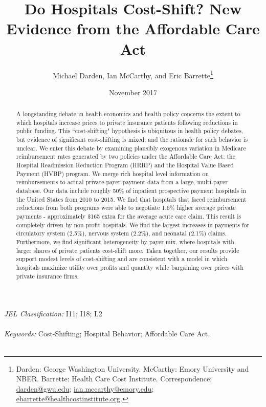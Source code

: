 \documentclass[12pt]{article}
\begin{document}
\title{Do Hospitals Cost-Shift? New Evidence from the Affordable Care Act}
\author{%
  Michael Darden, Ian McCarthy, and Eric Barrette\thanks{Darden: George Washington University. McCarthy: Emory University and NBER. Barrette: Health Care Cost Institute.  Correspondence: \href{mailto:darden@gwu.edu}{darden@gwu.edu}; \href{mailto:ian.mccarthy@emory.edu}{ian.mccarthy@emory.edu}; \href{mailto:ebarrette@healthcostinstitute.org}{ebarrette@healthcostinstitute.org}.}
}
\date{November 2017}

\maketitle

\begin{abstract}
A longstanding debate in health economics and health policy concerns the extent to which hospitals increase prices to private insurance patients following reductions in public funding.  This ``cost-shifting" hypothesis is ubiquitous in health policy debates, but evidence of significant cost-shifting is mixed, and the rationale for such behavior is unclear.  We enter this debate by examining plausibly exogenous variation in Medicare reimbursement rates generated by two policies under the Affordable Care Act: the Hospital Readmission Reduction Program (HRRP) and the Hospital Value Based Payment (HVBP) program.  We merge rich hospital level information on reimbursements to actual private-payer payment  data from a large, multi-payer database.  Our data include roughly 50$\%$ of inpatient prospective payment hospitals in the United States from 2010 to 2015.  We find that hospitals that faced reimbursement reductions from both programs were able to negotiate 1.6$\%$ higher average private payments - approximately $\$$165 extra for the average acute care claim.  This result is completely driven by non-profit hospitals.  We find the largest increases in payments for circulatory system (2.5$\%$), nervous system (2.2$\%$), and neonatal (2.1$\%$) claims.  Furthermore, we find significant heterogeneity by payer mix, where hospitals with larger shares of private patients cost-shift more.  Taken together, our results provide support modest levels of cost-shifting and are consistent with a model in which hospitals maximize utility over profits and quantity while bargaining over prices with private insurance firms.
\end{abstract}
\noindent \textit{JEL Classification:} I11; I18; L2 \\\\
\noindent \textit{Keywords:} Cost-Shifting; Hospital Behavior; Affordable Care Act.\\\\
\end{document}
